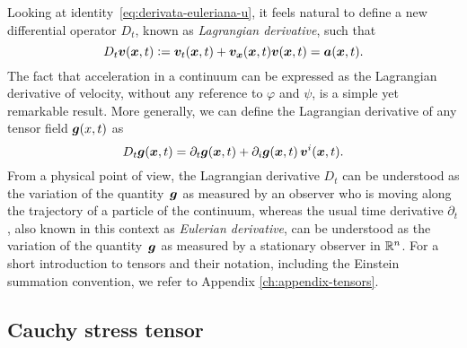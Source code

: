 Looking at identity~\eqref{eq:derivata-euleriana-u}, it feels natural
to define a new differential operator $D_t$, known as
\emph{Lagrangian derivative}, such that
\[
D_t \bm{v}(\bm{x},t) \vcentcolon= \bm{v}_t(\bm{x},t)
+ \bm{v}_{\bm{x}}(\bm{x},t) \bm{v}(\bm{x},t)
= \bm{a}(\bm{x},t).
\]
The fact that acceleration in a continuum can be expressed
as the Lagrangian derivative of velocity, without any
reference to $\varphi$ and $\psi$, is a simple yet remarkable result.
More generally, we can define the Lagrangian derivative of
any tensor field $\bm{g}(x,t)$ as
\begin{equation} \label{eq:derivata-lagrangiana}
D_t \bm{g}(\bm{x},t)
= \partial_t \bm{g}(\bm{x},t)
+ \partial_i \bm{g}(\bm{x},t) \, \bm{v}^i(\bm{x},t).
\end{equation}
From a physical point of view, the Lagrangian derivative $D_t$
can be understood as the variation of the quantity~$\bm{g}$ as
measured by an observer who is moving along the trajectory
of a particle of the continuum, whereas the usual time derivative $\partial_t$,
also known in this context as \emph{Eulerian derivative}, can be understood
as the variation of the quantity~$\bm{g}$ as measured by a stationary
observer in $\mathbb{R}^n$.
For a short introduction to tensors and their notation,
including the Einstein summation convention,
we refer to Appendix \ref{ch:appendix-tensors}.

\subsection*{Cauchy stress tensor}

